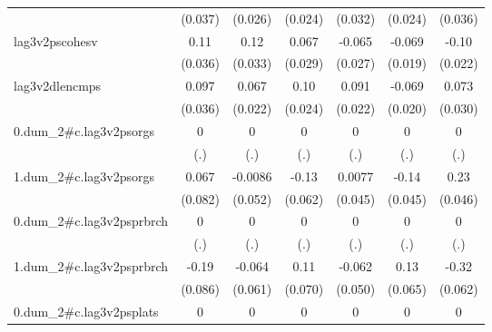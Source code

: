 \begin{table}[htbp]
\begin{tabular}{l*{6}{c}}
            &     (0.037)         &     (0.026)         &     (0.024)         &     (0.032)         &     (0.024)         &     (0.036)         \\
[1em]
lag3v2pscohesv&        0.11\sym{**} &        0.12\sym{***}&       0.067\sym{*}  &      -0.065\sym{*}  &      -0.069\sym{***}&       -0.10\sym{***}\\
            &     (0.036)         &     (0.033)         &     (0.029)         &     (0.027)         &     (0.019)         &     (0.022)         \\
[1em]
lag3v2dlencmps&       0.097\sym{**} &       0.067\sym{**} &        0.10\sym{***}&       0.091\sym{***}&      -0.069\sym{***}&       0.073\sym{*}  \\
            &     (0.036)         &     (0.022)         &     (0.024)         &     (0.022)         &     (0.020)         &     (0.030)         \\
[1em]
0.dum\_2#c.lag3v2psorgs&           0         &           0         &           0         &           0         &           0         &           0         \\
            &         (.)         &         (.)         &         (.)         &         (.)         &         (.)         &         (.)         \\
[1em]
1.dum\_2#c.lag3v2psorgs&       0.067         &     -0.0086         &       -0.13\sym{*}  &      0.0077         &       -0.14\sym{**} &        0.23\sym{***}\\
            &     (0.082)         &     (0.052)         &     (0.062)         &     (0.045)         &     (0.045)         &     (0.046)         \\
[1em]
0.dum\_2#c.lag3v2psprbrch&           0         &           0         &           0         &           0         &           0         &           0         \\
            &         (.)         &         (.)         &         (.)         &         (.)         &         (.)         &         (.)         \\
[1em]
1.dum\_2#c.lag3v2psprbrch&       -0.19\sym{*}  &      -0.064         &        0.11         &      -0.062         &        0.13         &       -0.32\sym{***}\\
            &     (0.086)         &     (0.061)         &     (0.070)         &     (0.050)         &     (0.065)         &     (0.062)         \\
[1em]
0.dum\_2#c.lag3v2psplats&           0         &           0         &           0         &           0         &           0         &           0         \\

\end{tabular}
\end{table}

